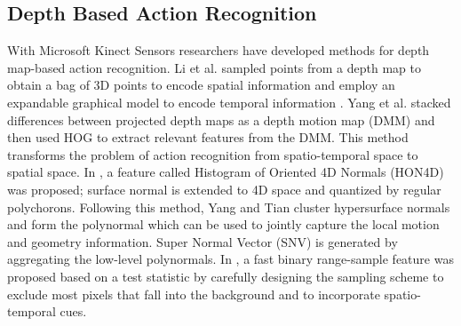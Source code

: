\documentclass[10pt, a4paper, conference]{IEEEtran}
\begin{document}
\subsection{Depth Based Action Recognition}
With Microsoft Kinect Sensors researchers have developed methods for depth map-based action recognition. Li et al. \cite{li2010action} sampled points 
from a depth map to obtain a bag of 3D points to encode spatial information and 
employ an expandable graphical model to encode temporal information 
\cite{li2008}. Yang et al. \cite{Yang2012a} stacked differences between projected depth maps as 
a depth motion map (DMM) and then used HOG to extract relevant features from the 
DMM. This method transforms the problem of action recognition from 
spatio-temporal space to spatial space.  In \cite{Oreifej2013}, a feature called Histogram of Oriented 4D 
Normals (HON4D) was proposed; surface normal is extended to 4D space and 
quantized by regular polychorons. Following this method, Yang and Tian 
\cite{yangsuper} cluster hypersurface normals and form the polynormal which can 
be used to jointly capture the local motion and geometry information. Super 
Normal Vector (SNV) is generated by aggregating the low-level polynormals. In 
\cite{lurange}, a fast binary range-sample feature was proposed based on a test 
statistic by carefully designing the sampling scheme to exclude most pixels that 
fall into the background and to incorporate spatio-temporal cues. 
\end{document}
